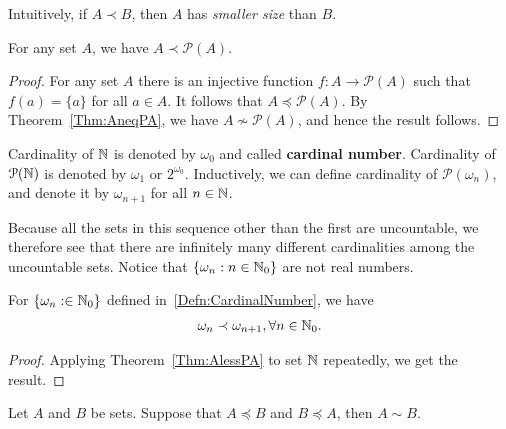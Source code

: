 \documentclass[a4paper,english,12pt]{article}   	%
\begin{document}
\begin{rem} Intuitively, if $A \prec B$, then $A$ has \textit{smaller size} than $B$.
\end{rem}
\begin{thm}\label{Thm:AlessPA} For any set $A$, we have $A \prec \mathcal{P}(A)$.
\end{thm}
\begin{proof} For any set $A$ there is an injective function $f: A \to \mathcal{P}(A)$ such that $f(a) = \{a\}$ for all $a \in A$. It follows that $A \preccurlyeq \mathcal{P}(A)$. By Theorem~\ref{Thm:AneqPA}, we have $A \nsim \mathcal{P}(A)$, and hence the result follows. 
\end{proof}
\begin{defn}\label{Defn:CardinalNumber} Cardinality of $\mathbb{N}$ is denoted by $\omega_0$ and called \textbf{cardinal number}. Cardinality of $\mathcal{P}(\mathbb{N})$ is denoted by $\omega_1$ or $2^{\omega_0}$. Inductively, we can define cardinality of $\mathcal{P}(\omega_n)$, and denote it by $\omega_{n+1}$ for all $n \in \mathbb{N}$.
\end{defn}
\begin{rem}
Because all the sets in this sequence other than the first are uncountable, we therefore see that there are infinitely many different cardinalities among the uncountable sets. Notice that $\{\omega_n: n \in \mathbb{N}_0\}$ are not real numbers. %
\end{rem}
\begin{thm} For $\{\omega_n: \in \mathbb{N}_0\}$ defined in~\ref{Defn:CardinalNumber}, we have
\begin{align*}
\omega_n \prec \omega_{n+1}, \forall n \in \mathbb{N}_0.
\end{align*}
\end{thm}
\begin{proof} Applying Theorem~\ref{Thm:AlessPA} to set $\mathbb{N}$ repeatedly, we get the result.
\end{proof}
\begin{thm}
Let $A$ and $B$ be sets. Suppose that $A \preccurlyeq B$ and $B \preccurlyeq A$, then $A \sim B$.
\end{thm}
\end{document}
